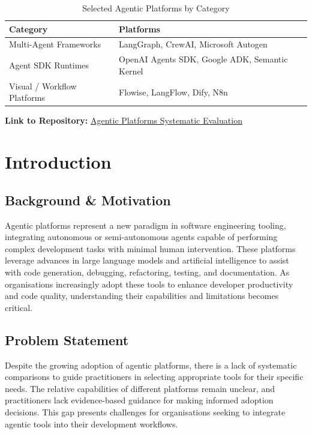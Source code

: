 \documentclass[]
{UCD_CS_FYP_Report}
\begin{document}
\begin{table}[H]
  \centering
  \begin{tabular}{|l|l|}
    \hline
    \textbf{Category}           & \textbf{Platforms}                             \\
    \hline
    Multi-Agent Frameworks      & LangGraph, CrewAI, Microsoft Autogen           \\
    \hline
    Agent SDK Runtimes          & OpenAI Agents SDK, Google ADK, Semantic Kernel \\
    \hline
    Visual / Workflow Platforms & Flowise, LangFlow, Dify, N8n                   \\
    \hline
  \end{tabular}
  \caption{Selected Agentic Platforms by Category}
\end{table}

\textbf{Link to Repository:}
\href{https://csgitlab.ucd.ie/cmd/agentic-platforms-systematic-evaluation}{Agentic Platforms Systematic Evaluation}


\chapter{Introduction}

\section{Background \& Motivation}

Agentic platforms represent a new paradigm in software engineering tooling, integrating autonomous or semi-autonomous agents capable of performing complex development tasks with minimal human intervention. These platforms leverage advances in large language models and artificial intelligence to assist with code generation, debugging, refactoring, testing, and documentation. As organisations increasingly adopt these tools to enhance developer productivity and code quality, understanding their capabilities and limitations becomes critical.

\section{Problem Statement}

Despite the growing adoption of agentic platforms, there is a lack of systematic comparisons to guide practitioners in selecting appropriate tools for their specific needs. The relative capabilities of different platforms remain unclear, and practitioners lack evidence-based guidance for making informed adoption decisions. This gap presents challenges for organisations seeking to integrate agentic tools into their development workflows.
\end{document}
